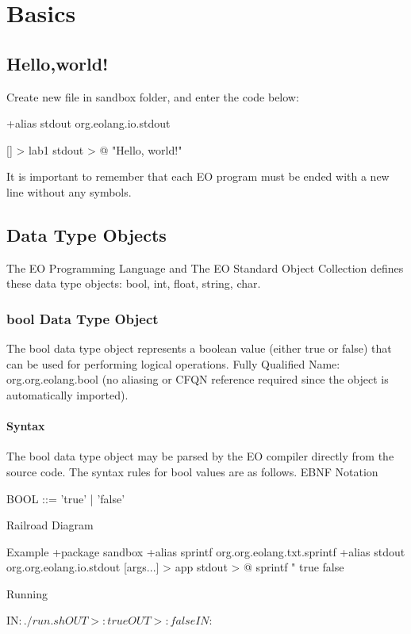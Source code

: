 \documentclass[12pt]{book}
\begin{document}
\chapter{Basics}

\section{Hello,world!}
Create new file  in sandbox folder, and enter the code below:

\begin{ffcode}
+alias stdout org.eolang.io.stdout

[] > lab1
  stdout > @
    "Hello, world!"
\end{ffcode}

It is important to remember that each EO program must be ended with a new line without any symbols.


\section{Data Type Objects}

The EO Programming Language and The EO Standard Object Collection defines these data type objects: bool, int, float, string, char.

\subsection{bool Data Type Object}
The bool data type object represents a boolean value (either true or false) that can be used for performing logical operations.
Fully Qualified Name: org.org.eolang.bool (no aliasing or CFQN reference required since the object is automatically imported).

\subsubsection{Syntax}
The bool data type object may be parsed by the EO compiler directly from the source code. The syntax rules for bool values are as follows.
EBNF Notation

\begin{ffcode}
BOOL     ::= 'true'
           | 'false'
\end{ffcode}
Railroad Diagram

\begin{ffcode}
Example
+package sandbox
+alias sprintf org.org.eolang.txt.sprintf
+alias stdout org.org.eolang.io.stdout
[args...] > app
  stdout > @
    sprintf
      "%
      true
      false

Running

IN$: ./run.sh
OUT>: true
OUT>: false
IN$: 
\end{ffcode}
\end{document}
